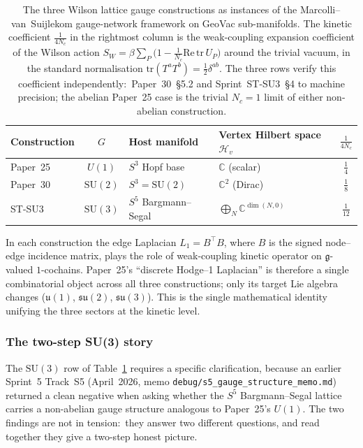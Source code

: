 \documentclass[11pt]{article}
\begin{document}
\begin{table}[h]
\centering
\small
\begin{tabular}{|l|c|l|l|c|}
\hline
\textbf{Construction} & $G$ & \textbf{Host manifold} &
\textbf{Vertex Hilbert space} $\mathcal{H}_v$ &
$\frac{1}{4 N_c}$ \\
\hline
Paper~25 & $U(1)$ & $S^3$ Hopf base & $\mathbb{C}$ (scalar) &
$\frac{1}{4}$ \\
Paper~30 & $\mathrm{SU}(2)$ & $S^3 = \mathrm{SU}(2)$ &
$\mathbb{C}^2$ (Dirac) & $\frac{1}{8}$ \\
ST-SU3 & $\mathrm{SU}(3)$ & $S^5$ Bargmann--Segal &
$\bigoplus_N \mathbb{C}^{\dim(N,0)}$ & $\frac{1}{12}$ \\
\hline
\end{tabular}
\caption{The three Wilson lattice gauge constructions as instances of
the Marcolli--van~Suijlekom gauge-network framework on GeoVac
sub-manifolds.  The kinetic coefficient
$\tfrac{1}{4 N_c}$ in the rightmost column is the weak-coupling
expansion coefficient of the Wilson action $S_W = \beta \sum_P \bigl(
1 - \tfrac{1}{N_c} \mathrm{Re}\,\mathrm{tr}\,U_P \bigr)$ around the
trivial vacuum, in the standard normalisation
$\mathrm{tr}(T^a T^b) = \tfrac{1}{2} \delta^{ab}$.  The three rows
verify this coefficient independently:\ Paper~30~\S 5.2 and
Sprint~ST-SU3~\S 4 to machine precision; the abelian Paper~25
case is the trivial $N_c = 1$ limit of either non-abelian
construction.}
\label{tab:unified_gauge}
\end{table}

In each construction the edge Laplacian $L_1 = B^{\top} B$, where
$B$ is the signed node--edge incidence matrix, plays the role of
weak-coupling kinetic operator on $\mathfrak{g}$-valued $1$-cochains.
Paper~25's ``discrete Hodge--1 Laplacian'' is therefore a single
combinatorial object across all three constructions; only its target
Lie algebra changes ($\mathfrak{u}(1)$, $\mathfrak{su}(2)$,
$\mathfrak{su}(3)$).  This is the single mathematical identity
unifying the three sectors at the kinetic level.

\subsubsection*{The two-step SU(3) story}

The $\mathrm{SU}(3)$ row of Table~\ref{tab:unified_gauge} requires a
specific clarification, because an earlier Sprint~5 Track~S5
(April~2026, memo \texttt{debug/s5\_gauge\_structure\_memo.md})
returned a clean negative when asking whether the $S^5$
Bargmann--Segal lattice carries a non-abelian gauge structure
analogous to Paper~25's $U(1)$.  The two findings are not in tension:\
they answer two different questions, and read together they give a
two-step honest picture.
\end{document}
